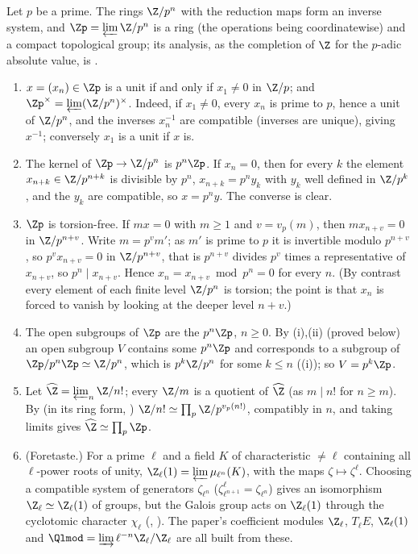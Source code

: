 \begin{example}\label{ex:groups:zp}
Let $p$ be a prime. The rings $\Z/p^n$ with the reduction maps form an inverse system, and $\Zp=\varprojlim\Z/p^n$ is a ring (the operations being coordinatewise) and a
compact topological group; its analysis, as the completion of $\Z$ for the $p$-adic absolute value, is .
\begin{enumerate}[label=(\alph*)]
\item $x=(x_n)\in\Zp$ is a unit if and only if $x_1\ne0$ in $\Z/p$; and $\Zp^\times=\varprojlim(\Z/p^n)^\times$. Indeed, if $x_1\ne0$, every $x_n$ is prime to $p$, hence a unit of
$\Z/p^n$, and the inverses $x_n^{-1}$ are compatible (inverses are unique), giving $x^{-1}$; conversely $x_1$ is a unit if $x$ is.
\item The kernel of $\Zp\to\Z/p^n$ is $p^n\Zp$. If $x_n=0$, then for every $k$ the element $x_{n+k}\in\Z/p^{n+k}$ is divisible by $p^n$, $x_{n+k}=p^ny_k$ with $y_k$ well defined
in $\Z/p^k$, and the $y_k$ are compatible, so $x=p^ny$. The converse is clear.
\item $\Zp$ is torsion-free. If $mx=0$ with $m\ge1$ and $v=v_p(m)$, then $mx_{n+v}=0$ in $\Z/p^{n+v}$. Write $m=p^vm'$; as $m'$ is prime to $p$ it is invertible
modulo $p^{n+v}$, so $p^vx_{n+v}=0$ in $\Z/p^{n+v}$, that is $p^{n+v}$ divides $p^v$ times a representative of $x_{n+v}$, so $p^n\mid x_{n+v}$. Hence $x_n=x_{n+v}\bmod p^n=0$
for every $n$. (By contrast every element of each finite level $\Z/p^n$ is torsion; the point is that $x_n$ is forced to vanish by looking at the deeper
level $n+v$.)
\item The open subgroups of $\Zp$ are the $p^n\Zp$, $n\ge0$. By (i),(ii) (proved below) an open subgroup $V$ contains some $p^n\Zp$ and corresponds to a subgroup of
$\Zp/p^n\Zp\simeq\Z/p^n$, which is $p^k\Z/p^n$ for some $k\le n$ ((i)); so $V=p^k\Zp$.
\item Let $\widehat\Z=\varprojlim_n\Z/n!$; every $\Z/m$ is a quotient of $\widehat\Z$ (as $m\mid n!$ for $n\ge m$). By  (in its ring form, )
$\Z/n!\simeq\prod_p\Z/p^{v_p(n!)}$, compatibly in $n$, and taking limits gives $\widehat\Z\simeq\prod_p\Zp$.
\item (Foretaste.) For a prime $\ell$ and a field $K$ of characteristic $\ne\ell$ containing all $\ell$-power roots of unity, $\Z_\ell(1)=\varprojlim\mu_{\ell^n}(K)$, with the
maps $\zeta\mapsto\zeta^\ell$. Choosing a compatible system of generators $\zeta_{\ell^n}$ ($\zeta_{\ell^{n+1}}^\ell=\zeta_{\ell^n}$) gives an isomorphism $\Z_\ell\simeq\Z_\ell(1)$ of groups, but the
Galois group acts on $\Z_\ell(1)$ through the cyclotomic character $\chi_\ell$ (, ). The paper's coefficient modules $\Z_\ell$, $T_\ell E$,
$\Z_\ell(1)$ and $\Qlmod=\varinjlim\ell^{-n}\Z_\ell/\Z_\ell$ are all built from these.
\end{enumerate}
\end{example}

